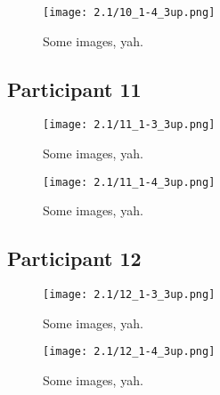 \clearpage

\begin{figure}[h]
	\begin{center}
	\texttt{[image: 2.1/10\_1-4\_3up.png]}
	\caption{Some images, yah.}
	\end{center}
\end{figure}


\clearpage

\subsection{Participant 11}

\begin{figure}[h]
	\begin{center}
	\texttt{[image: 2.1/11\_1-3\_3up.png]}
	\caption{Some images, yah.}
	\end{center}
\end{figure}

\clearpage

\begin{figure}[h]
	\begin{center}
	\texttt{[image: 2.1/11\_1-4\_3up.png]}
	\caption{Some images, yah.}
	\end{center}
\end{figure}


\clearpage

\subsection{Participant 12}

\begin{figure}[h]
	\begin{center}
	\texttt{[image: 2.1/12\_1-3\_3up.png]}
	\caption{Some images, yah.}
	\end{center}
\end{figure}

\clearpage

\begin{figure}[h]
	\begin{center}
	\texttt{[image: 2.1/12\_1-4\_3up.png]}
	\caption{Some images, yah.}
	\end{center}
\end{figure}

